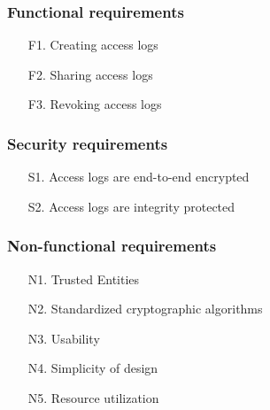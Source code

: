 \documentclass[../main.tex]{subfiles}
\begin{document}
\subsubsection{Functional requirements}
\begin{itemize}
    \item [F1.] Creating access logs
    \item [F2.] Sharing access logs
    \item [F3.] Revoking access logs
\end{itemize}

\subsubsection{Security requirements}
\begin{itemize}
    \item [S1.] Access logs are end-to-end encrypted
    \item [S2.] Access logs are integrity protected
\end{itemize}

\subsubsection{Non-functional requirements}
\begin{itemize}
    \item [N1.] Trusted Entities
    \item [N2.] Standardized cryptographic algorithms
    \item [N3.] Usability
    \item [N4.] Simplicity of design
    \item [N5.] Resource utilization
\end{itemize}
\end{document}
